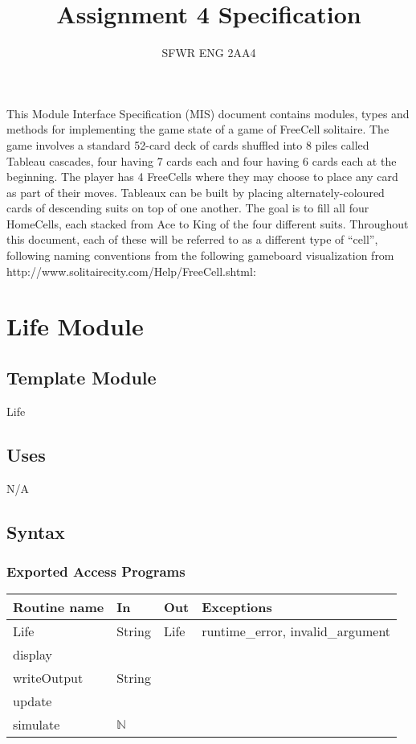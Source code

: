 \documentclass[12pt]{article}
\title{Assignment 4 Specification}
\author{SFWR ENG 2AA4}
\begin{document}
\maketitle

\noindent This Module Interface Specification (MIS) document contains modules, types and methods for implementing the game state of 
a game of FreeCell solitaire. The game involves a standard 52-card deck of cards shuffled into 8 piles called Tableau cascades, four 
having 7 cards each and four having 6 cards each at the beginning. The player has 4 FreeCells where they may choose to place any 
card as part of their moves. Tableaux can be built by placing alternately-coloured cards of descending suits on top of one another. 
The goal is to fill all four HomeCells, each stacked from Ace to King of the four different suits. Throughout this document, each of these
will be referred to as a different type of ``cell'', following naming 
conventions from the following gameboard visualization from http://www.solitairecity.com/Help/FreeCell.shtml:
\begin{center}

\end{center}

\newpage

\section* {Life Module}

\subsection*{Template Module}

Life

\subsection* {Uses}

N/A

\subsection* {Syntax}

\subsubsection* {Exported Access Programs}

\begin{tabular}{| l | l | l | l |}
\hline
\textbf{Routine name} & \textbf{In} & \textbf{Out} & \textbf{Exceptions}\\
\hline
Life & String & Life & runtime\_error, invalid\_argument\\
\hline
display  & & &\\
\hline
writeOutput & String & &\\
\hline
update & & &\\
\hline
simulate & $\mathbb{N}$ & &\\
\hline
\end{tabular}
\end{document}
